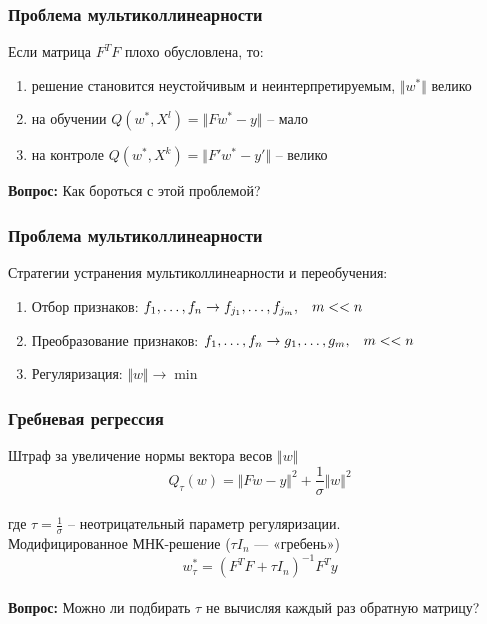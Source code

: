 \documentclass[10pt]{beamer}
\begin{document}
\begin{frame}\frametitle{Проблема мультиколлинеарности}
Если матрица $F^TF$ плохо обусловлена, то: 
\begin{enumerate}[--]
\item решение становится неустойчивым и неинтерпретируемым, $\Vert w^* \Vert $ велико
\item на обучении $Q(w^*, X^l) = \Vert Fw^* -y \Vert$ -- мало   
\item на контроле $Q(w^*, X^k) = \Vert F'w^* -y' \Vert$ -- велико
\end{enumerate}
\textbf{Вопрос:} Как бороться с этой проблемой?
\end{frame}

\begin{frame}\frametitle{Проблема мультиколлинеарности}
Стратегии устранения мультиколлинеарности и переобучения:
\begin{enumerate}[--]
\item Отбор признаков: $f_1, \dots, f_n \rightarrow f_{j_1}, \dots, f_{j_m}, \hspace{3mm} m << n$
\item Преобразование признаков: $f_1, \dots, f_n \rightarrow g_1, \dots, g_m,\hspace{3mm}  m << n$
\item Регуляризация: $\Vert w \Vert \rightarrow \min$
\end{enumerate}
\end{frame}


\begin{frame}\frametitle{Гребневая регрессия}
Штраф за увеличение нормы вектора весов $\Vert w \Vert$\\
$$Q_{\tau} (w) = \Vert F w - y \Vert^2 + \frac{1}{\sigma} \Vert w \Vert^2$$\\
где $\tau = \frac{1}{\sigma}$ -- неотрицательный параметр регуляризации.\\
\vspace{5mm}
Модифицированное МНК-решение ($\tau I_n$ — «гребень»)\\
$$w^*_{\tau} = (F^TF + \tau I_n)^{-1}F^Ty$$\\

\textbf{Вопрос:} Можно ли подбирать $\tau$ не вычисляя каждый раз обратную матрицу?
\end{frame}
\end{document}
